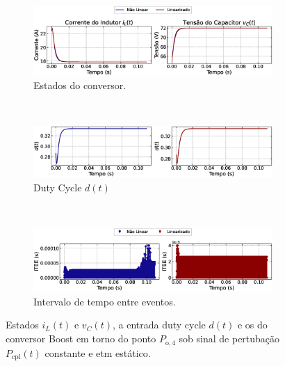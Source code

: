 \begin{figure}[H]
  \centering
  \captionsetup{justification=centering}
  \begin{subfigure}{1.\textwidth}
    \centering
    \includegraphics[width=1.\textwidth]{figuras/static-etm/boost/sim1/op2/result.eps}
    \caption{Estados do conversor.}
    \label{fig:boost_converter_constant_pcpl_static_etm_op2_duty_a}
  \end{subfigure}
  \\[6pt]
  \begin{subfigure}{1.\textwidth}
    \centering
    \includegraphics[width=1.\textwidth]{figuras/static-etm/boost/sim1/op2/duty-cycle.eps}
    \caption{Duty Cycle $d(t)$}
    \label{fig:boost_converter_constant_pcpl_static_etm_op2_duty_b}
  \end{subfigure}
  \\[6pt]
  \begin{subfigure}{1.\textwidth}
    \centering
    \includegraphics[width=1.\textwidth]{figuras/static-etm/boost/sim1/op2/inter-event-times.eps}
    \caption{Intervalo de tempo entre eventos.}
    \label{fig:boost_converter_constant_pcpl_static_etm_op2_duty_c}
  \end{subfigure}
  \caption{Estados $i_L(t)$ e $v_C(t)$, a entrada duty cycle $d(t)$ e os  do conversor Boost em torno do ponto $P_{\mathrm{o}, 4}$ sob sinal de pertubação $P_{\mathrm{cpl}}(t)$ constante e \acrshort{etm} estático.}
\end{figure}

